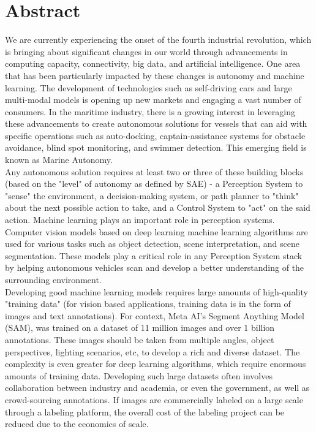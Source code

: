 \chapter{Abstract}

We are currently experiencing the onset of the fourth industrial revolution, which is bringing about significant changes in our world through advancements in computing capacity, connectivity, big data, and artificial intelligence. One area that has been particularly impacted by these changes is autonomy and machine learning. The development of technologies such as self-driving cars and large multi-modal models is opening up new markets and engaging a vast number of consumers. In the maritime industry, there is a growing interest in leveraging these advancements to create autonomous solutions for vessels that can aid with specific operations such as auto-docking, captain-assistance systems for obstacle avoidance, blind spot monitoring, and swimmer detection. This emerging field is known as Marine Autonomy. \\

Any autonomous solution requires at least two or three of these building blocks (based on the "level" of autonomy as defined by SAE) - a Perception System to "sense" the environment, a decision-making system, or path planner to "think" about the next possible action to take, and a Control System to "act" on the said action. Machine learning plays an important role in perception systems. Computer vision models based on deep learning machine learning algorithms are used for various tasks such as object detection, scene interpretation, and scene segmentation. These models play a critical role in any Perception System stack by helping autonomous vehicles scan and develop a better understanding of the surrounding environment. \\

Developing good machine learning models requires large amounts of high-quality "training data" (for vision based applications, training data is in the form of images and text annotations). For context, Meta AI's Segment Anything Model (SAM), was trained on a dataset of 11 million images and over 1 billion annotations. These images should be taken from multiple angles, object perspectives, lighting scenarios, etc, to develop a rich and diverse dataset. The complexity is even greater for deep learning algorithms, which require enormous amounts of training data. Developing such large datasets often involves collaboration between industry and academia, or even the government, as well as crowd-sourcing annotations. If images are commercially labeled on a large scale through a labeling platform, the overall cost of the labeling project can be reduced due to the economics of scale. \\

